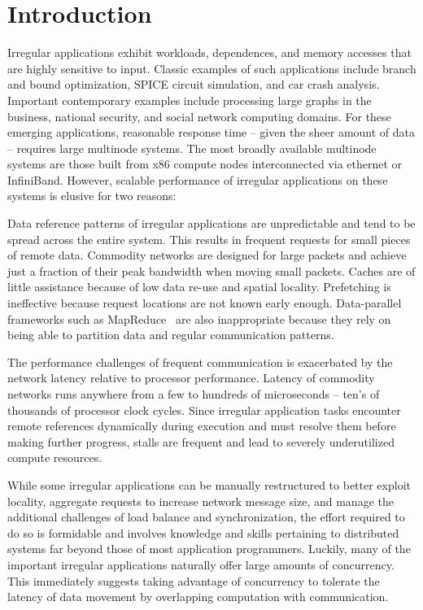 \section{Introduction} \label{sec:intro}

Irregular applications exhibit workloads, dependences, and memory accesses
that are highly sensitive to input. Classic examples of such applications
include branch and bound optimization, SPICE circuit simulation, and car crash
analysis. Important contemporary examples include processing large graphs in
the business, national security, and social network computing domains. For
these emerging applications, reasonable response time -- given the sheer
amount of data -- requires large multinode systems. The most broadly available
multinode systems are those built from x86 compute nodes interconnected via
ethernet or InfiniBand. However, scalable performance of irregular
applications on these systems is elusive for two reasons:

\vspace{0.5ex}
 Data reference patterns of irregular applications are unpredictable and tend to be spread across the entire system. This results in frequent requests for small pieces of remote data. Commodity networks are designed for large packets and achieve just a fraction of their peak bandwidth when moving small packets. Caches are of little assistance because of low data re-use and spatial locality. Prefetching is ineffective because request locations are not known early enough. Data-parallel frameworks such as MapReduce~\cite{mapreduce:osdi04} are also inappropriate because they rely on being able to partition data and regular communication patterns.

\vspace{0.5ex}  The performance challenges of frequent communication is exacerbated by the network latency relative to processor performance. Latency of commodity networks runs anywhere from a few to hundreds of microseconds -- ten's of thousands of processor clock cycles.  Since irregular application tasks encounter remote references dynamically during execution and must resolve them before making further progress, stalls are frequent and lead to severely underutilized compute resources.

While some irregular applications can be manually restructured to better exploit locality, aggregate requests to increase network message size, and manage the additional challenges of load balance and synchronization, the effort required to do so is formidable and involves knowledge and skills pertaining to distributed systems far beyond those of most application programmers. Luckily, many of the important irregular applications naturally offer large amounts of concurrency. This immediately suggests taking advantage of concurrency to tolerate the latency of data movement by overlapping computation with communication.

